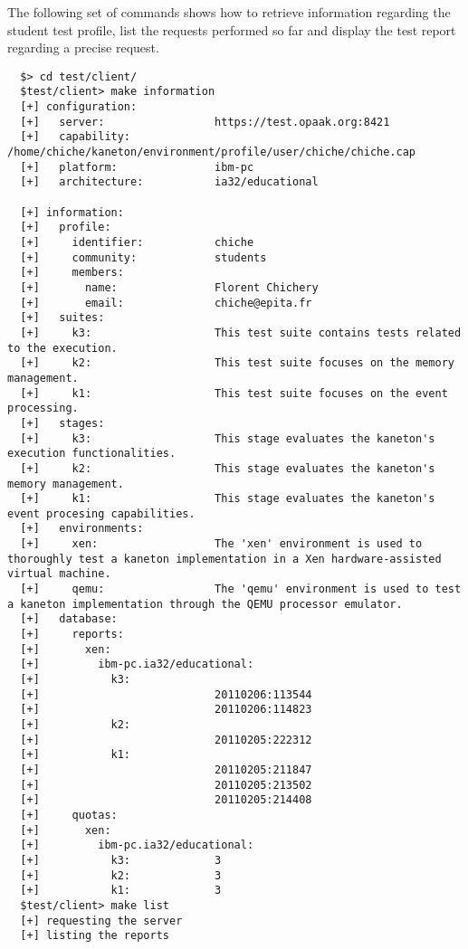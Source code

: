 \begin{center}
\end{center}

The following set of commands shows how to retrieve information regarding the
student test profile, list the requests performed so far and display the
test report regarding a precise request.

\begin{verbatim}
  $> cd test/client/
  $test/client> make information
  [+] configuration:
  [+]   server:                 https://test.opaak.org:8421
  [+]   capability:             /home/chiche/kaneton/environment/profile/user/chiche/chiche.cap
  [+]   platform:               ibm-pc
  [+]   architecture:           ia32/educational

  [+] information:
  [+]   profile:
  [+]     identifier:           chiche
  [+]     community:            students
  [+]     members:
  [+]       name:               Florent Chichery
  [+]       email:              chiche@epita.fr
  [+]   suites:
  [+]     k3:                   This test suite contains tests related to the execution.
  [+]     k2:                   This test suite focuses on the memory management.
  [+]     k1:                   This test suite focuses on the event processing.
  [+]   stages:
  [+]     k3:                   This stage evaluates the kaneton's execution functionalities.
  [+]     k2:                   This stage evaluates the kaneton's memory management.
  [+]     k1:                   This stage evaluates the kaneton's event procesing capabilities.
  [+]   environments:
  [+]     xen:                  The 'xen' environment is used to thoroughly test a kaneton implementation in a Xen hardware-assisted virtual machine.
  [+]     qemu:                 The 'qemu' environment is used to test a kaneton implementation through the QEMU processor emulator.
  [+]   database:
  [+]     reports:
  [+]       xen:
  [+]         ibm-pc.ia32/educational:
  [+]           k3:
  [+]                           20110206:113544
  [+]                           20110206:114823
  [+]           k2:
  [+]                           20110205:222312
  [+]           k1:
  [+]                           20110205:211847
  [+]                           20110205:213502
  [+]                           20110205:214408
  [+]     quotas:
  [+]       xen:
  [+]         ibm-pc.ia32/educational:
  [+]           k3:             3
  [+]           k2:             3
  [+]           k1:             3
  $test/client> make list
  [+] requesting the server
  [+] listing the reports

\end{verbatim}

